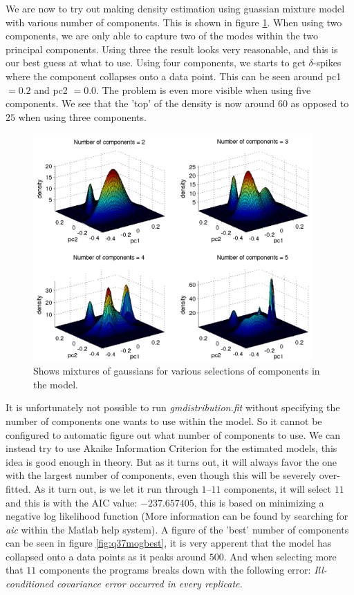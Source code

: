 \newpage

We are now to try out making density estimation using guassian mixture
model with various number of components. This is shown in figure
\ref{fig:q37mog}. When using two components, we are only able to
capture two of the modes within the two principal components. Using
three the result looks very reasonable, and this is our best guess at
what to use. Using four components, we starts to get $\delta$-spikes
where the component collapses onto a data point. This can be seen
around pc1 $= 0.2$ and pc2 $= 0.0$. The problem is even more visible
when using five components. We see that the 'top' of the density is
now around $60$ as opposed to $25$ when using three components.

\begin{figure}[!htbp]
  \centering
  \includegraphics[width=0.95\textwidth]{./images/q37mog}
  \caption{Shows mixtures of gaussians for various selections of
    components in the model.}
  \label{fig:q37mog}
\end{figure}

It is unfortunately not possible to run \emph{gmdistribution.fit}
without specifying the number of components one wants to use within
the model. So it cannot be configured to automatic figure out what
number of components to use. We can instead try to use Akaike
Information Criterion for the estimated models, this idea is good
enough in theory. But as it turns out, it will always favor the one
with the largest number of components, even though this will be
severely over-fitted. As it turn out, is we let it run through
$1$--$11$ components, it will select $11$ and this is with the AIC
value: $-237.657405$, this is based on minimizing a negative log
likelihood function (More information can be found by searching for
\emph{aic} within the Matlab help system). A figure of the 'best'
number of components can be seen in figure \ref{fig:q37mogbest}, it is
very apperent that the model has collapsed onto a data points as it
peaks around $500$. And when selecting more that $11$ components the
programs breaks down with the following error: \emph{Ill-conditioned
  covariance error occurred in every replicate.}

